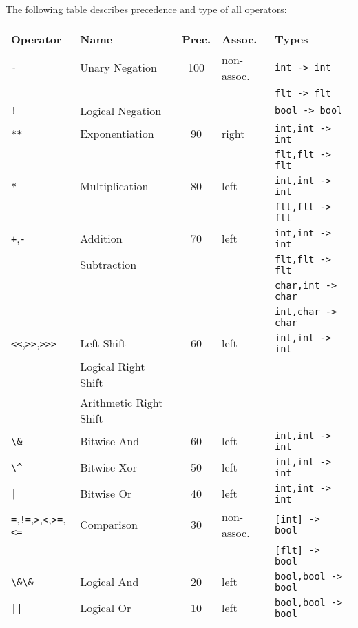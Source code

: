 \documentclass{article}
\newcommand{\code}[1]{\lstinline[columns=fixed]{#1}}
\begin{document}
		The following table describes precedence and type of all operators:\\
		
		\begin{tabular}{l|l|c|l|l}
			\textbf{Operator} & \textbf{Name} & \textbf{Prec.} & \textbf{Assoc.} & \textbf{Types}\\
			\midrule
			\code{-} & Unary Negation & 100 & non-assoc. & \code{int -> int}\\
				&&&& \code{flt -> flt}\\
			\code{!} & Logical Negation &&& \code{bool -> bool}\\
			\midrule
			\code{**} & Exponentiation & 90 & right & \code{int,int -> int}\\
				&&&& \code{flt,flt -> flt}\\
			\midrule
			\code{*} & Multiplication & 80 & left & \code{int,int -> int}\\
				&&&& \code{flt,flt -> flt}\\
			\midrule
			\code{+},\code{-} & Addition & 70 & left & \code{int,int -> int}\\
				& Subtraction &&& \code{flt,flt -> flt}\\
				&&&& \code{char,int -> char}\\
				&&&& \code{int,char -> char}\\
			\midrule
			\code{<<},\code{>>},\code{>>>} & Left Shift & 60 & left & \code{int,int -> int}\\
			& Logical Right Shift &&& \\
			& Arithmetic Right Shift &&& \\
			\midrule
			\code{\&} & Bitwise And & 60 & left & \code{int,int -> int}\\
			\midrule
			\code{\^} & Bitwise Xor & 50 & left & \code{int,int -> int}\\
			\midrule
			\code{|} & Bitwise Or & 40 & left & \code{int,int -> int}\\
			\midrule
			\code{=},\code{!=},\code{>},\code{<},\code{>=},\code{<=} & Comparison & 30 & non-assoc. & \code{[int] -> bool} \\
				&&&& \code{[flt] -> bool}\\
			\midrule
			\code{\&\&} & Logical And & 20 & left & \code{bool,bool -> bool}\\
			\midrule
			\code{||} & Logical Or & 10 & left & \code{bool,bool -> bool}
		\end{tabular}\\
	
\end{document}
